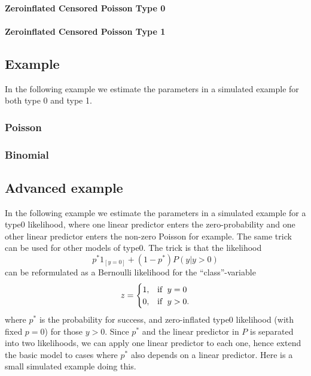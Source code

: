 \documentclass[a4paper,11pt]{article}
\begin{document}
\paragraph{Zeroinflated Censored Poisson Type 0}


\paragraph{Zeroinflated Censored Poisson Type 1}



\subsection*{Example}

In the following example we estimate the parameters in a simulated
example for both type 0 and type 1.
\subsubsection*{Poisson}



\subsubsection*{Binomial}



\clearpage

\subsection*{Advanced example}

In the following example we estimate the parameters in a simulated
example for a type0 likelihood, where one linear predictor enters the
zero-probability and one other linear predictor enters the non-zero
Poisson for example. The same trick can be used for other models of
type0.  The trick is that the likelihood
\begin{displaymath}
    p^{*} 1_{[y=0]} + (1-p^{*}) P(y | y > 0)
\end{displaymath}
can be reformulated as a Bernoulli likelihood for the
``class''-variable
\begin{displaymath}
    z =
    \begin{cases}
        1, & \text{if\; }y=0\\
        0, & \text{if\; }y > 0.
    \end{cases}
\end{displaymath}
where $p^{*}$ is the probability for success, and zero-inflated type0
likelihood (with fixed $p = 0$) for those $y > 0$. Since $p^{*}$ and
the linear predictor in $P$ is separated into two likelihoods, we can
apply one linear predictor to each one, hence extend the basic model
to cases where $p^{*}$ also depends on a linear predictor.  Here is a
small simulated example doing this.

\end{document}
